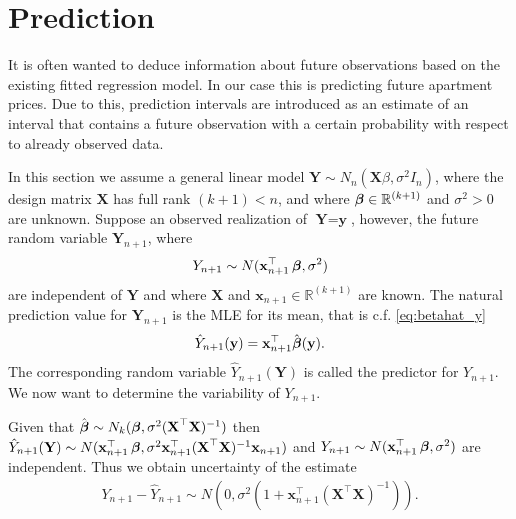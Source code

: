 



















\section{Prediction}
It is often wanted to deduce information about future observations based on the existing fitted regression model. 
In our case this is predicting future apartment prices. 
Due to this, prediction intervals are introduced as an estimate of an interval that contains a future observation with a certain probability with respect to already observed data.

In this section we assume a general linear model $\textbf{Y}\sim N_n(\textbf{X}\beta, \sigma^2 I_n)$, where the design matrix $\textbf{X}$ has full rank $(k+1)<n$, and where $\operatorname{\boldsymbol{\beta}} \in \mathbb{R}^{(k+1)}$ and $\sigma^2>0$ are unknown. Suppose an observed realization of $\textbf{Y}=\textbf{y}$, however, the future random variable $\textbf{Y}_{n+1}$, where
\begin{align*}
    Y_{n+1}\sim N(\textbf{x}^\top_{n+1}\operatorname{\boldsymbol{\beta}},\sigma^2)
\end{align*}
are independent of $\textbf{Y}$ and where $\textbf{X}$ and $\textbf{x}_{n+1}\in\mathbb{R}^{(k+1)}$ are known. 
The natural prediction value for $\textbf{Y}_{n+1}$ is the MLE for its mean, that is c.f. \eqref{eq:betahat_y}
\begin{align*}
    \hat{Y}_{n+1}(\textbf{y})=\textbf{x}^\top_{n+1}\hat{\operatorname{\boldsymbol{\beta}}}(\textbf{y}).
\end{align*}
The corresponding random variable $\hat{Y}_{n+1}(\textbf{Y})$ is called the predictor for $Y_{n+1}$. 
We now want to determine the variability of $Y_{n+1}$.

Given that $\hat{\operatorname{\boldsymbol{\beta}}} \sim N_k(\operatorname{\boldsymbol{\beta}},\sigma^2(\textbf{X}^\top\textbf{X})^{-1})$ then $\hat{Y}_{n+1}(\textbf{Y})\sim N(\textbf{x}^\top_{n+1}\operatorname{\boldsymbol{\beta}},\sigma^2\textbf{x}^\top_{n+1}(\textbf{X}^\top\textbf{X})^{-1}\textbf{x}_{n+1})$ and $Y_{n+1}\sim N(\textbf{x}^\top_{n+1}\operatorname{\boldsymbol{\beta}},\sigma^2)$ are independent.
Thus we obtain uncertainty of the estimate
\begin{align*}
    Y_{n+1}-\hat{Y}_{n+1} \sim N(0, \sigma^2(1+\textbf{x}^\top_{n+1}(\textbf{X}^\top\textbf{X})^{-1})).
\end{align*}

